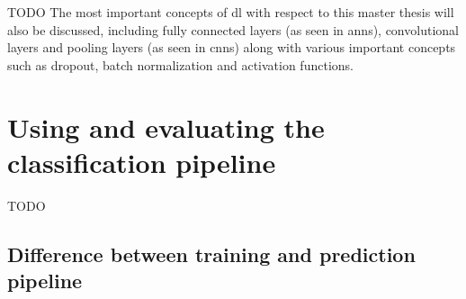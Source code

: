 





TODO
The most important concepts of \gls{dl} with respect to this master thesis will also be discussed, including fully connected layers (as seen in \glspl{ann}), convolutional layers and pooling layers (as seen in \glspl{cnn}) along with various important concepts such as dropout, batch normalization and activation functions.

\section{Using and evaluating the classification pipeline}
\label{sec:processing_signals_evaluating_and_using}



TODO


\subsection{Difference between training and prediction pipeline}
\label{subsec:processing_signals_evaluating_and_using_training_vs_prediction}


